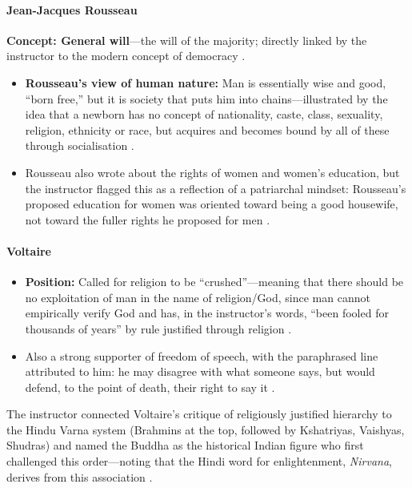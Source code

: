 \paragraph{Jean-Jacques Rousseau}
\begin{KeyConcept}
\textbf{Concept: General will}---the will of the majority; directly linked by the instructor to the modern concept of democracy .
\begin{itemize}
    \item \textbf{Rousseau's view of human nature:} Man is essentially wise and good, ``born free,'' but it is society that puts him into chains---illustrated by the idea that a newborn has no concept of nationality, caste, class, sexuality, religion, ethnicity or race, but acquires and becomes bound by all of these through socialisation .
    \item Rousseau also wrote about the rights of women and women's education, but the instructor flagged this as a reflection of a patriarchal mindset: Rousseau's proposed education for women was oriented toward being a good housewife, not toward the fuller rights he proposed for men .
\end{itemize}
\end{KeyConcept}

\paragraph{Voltaire}
\begin{KeyConcept}
\begin{itemize}
    \item \textbf{Position:} Called for religion to be ``crushed''---meaning that there should be no exploitation of man in the name of religion/God, since man cannot empirically verify God and has, in the instructor's words, ``been fooled for thousands of years'' by rule justified through religion .
    \item Also a strong supporter of freedom of speech, with the paraphrased line attributed to him: he may disagree with what someone says, but would defend, to the point of death, their right to say it .
\end{itemize}
\end{KeyConcept}

\begin{ExampleBox}
The instructor connected Voltaire's critique of religiously justified hierarchy to the Hindu Varna system (Brahmins at the top, followed by Kshatriyas, Vaishyas, Shudras) and named the Buddha as the historical Indian figure who first challenged this order---noting that the Hindi word for enlightenment, \textit{Nirvana}, derives from this association .
\end{ExampleBox}

